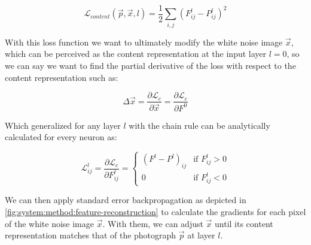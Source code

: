 \begin{equation}
  \mathcal{L}_{content}(\vec{p}, \vec{x}, l) = \frac{1}{2} \sum_{i,j}(F^l_{ij}-P^l_{ij})^2
\end{equation}

With this loss function we want to ultimately modify the white noise image $\vec{x}$, which can be perceived as the content representation at the input layer $l = 0$, so we can say we want to find the partial derivative of the loss with respect to the content representation such as:

\begin{equation}
  \Delta \vec{x} =
  \frac{\partial \mathcal{L}_{c}}{\partial \vec{x}} =
  \frac{\partial \mathcal{L}_{c}}{\partial F^0}
\end{equation}

Which generalized for any layer $l$ with the chain rule can be analytically calculated for every neuron as:

\begin{equation}
  \mathcal{L}^l_{ij} =
  \frac{\partial \mathcal{L}_{c}}{\partial F^l_{ij}} =
  \begin{cases}
    (F^l - P^l)_{ij} & \text{if } F^l_{ij} > 0 \\
    0                & \text{if } F^l_{ij} < 0
  \end{cases}
\end{equation}

We can then apply standard error backpropagation \cite{Orr2008} as depicted in \autoref{fig:system:method:feature-reconstruction} to calculate the gradients for each pixel of the white noise image $\vec{x}$.
With them, we can adjust $\vec{x}$ until its content representation matches that of the photograph $\vec{p}$ at layer $l$.

